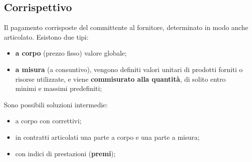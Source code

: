 \documentclass{article}
\begin{document}
\subsection{Corrispettivo}\label{sub:corrispettivo} %
Il pagamento corrisposte del committente al fornitore, determinato in modo anche articolato.
Esistono due tipi:
\begin{itemize}
    \item \textbf{a corpo} (prezzo fisso) valore globale;
    \item \textbf{a misura} (a consuntivo), vengono definiti valori unitari di prodotti forniti o risorse utilizzate, e viene \textbf{commisurato alla quantità}, di solito entro minimi e massimi predefiniti;
\end{itemize}
\begin{note}
    Sono possibili soluzioni intermedie:
    \begin{itemize}
        \item a corpo con correttivi;
        \item in contratti articolati una parte a corpo e una parte a misura;
        \item con indici di prestazioni (\textbf{premi});
    \end{itemize}
\end{note}
\end{document}
